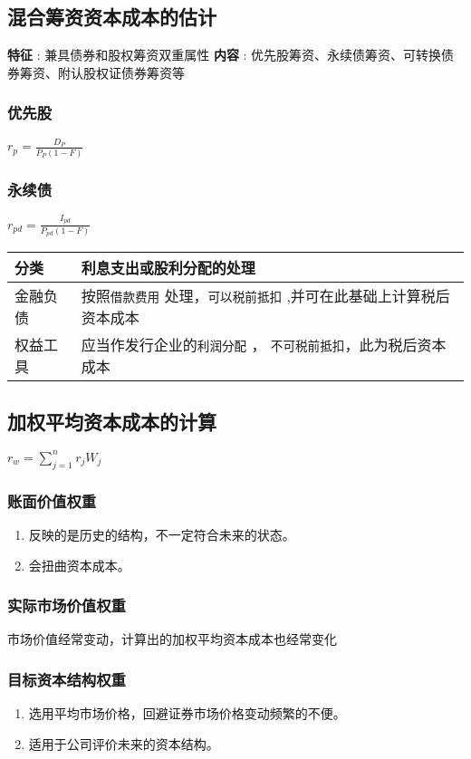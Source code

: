 \documentclass[11pt]{article}
\begin{document}
\subsection{混合筹资资本成本的估计}
\label{sec:org070e446}
\textbf{特征} : 兼具债券和股权筹资双重属性
\textbf{内容} : 优先股筹资、永续债筹资、可转换债券筹资、附认股权证债券筹资等
\subsubsection{优先股}
\label{sec:orgdbcb97a}
\(r_{p}=\frac{D_{P}}{P_{P}(1-F)}\)
\subsubsection{永续债}
\label{sec:orgd77cea3}
\(r_{pd}=\frac{I_{pd}}{P_{pd}(1-F)}\)
\begin{center}
\begin{tabular}{ll}
分类 & 利息支出或股利分配的处理\\
\hline
金融负债 & 按照\texttt{借款费用} 处理，\texttt{可以税前抵扣} ,并可在此基础上计算税后资本成本\\
权益工具 & 应当作发行企业的\texttt{利润分配} ， \texttt{不可税前抵扣}，此为税后资本成本\\
\end{tabular}
\end{center}
\subsection{加权平均资本成本的计算}
\label{sec:orgf6ab5e4}
\(r_{w} = \limits\sum^{n}_{j=1}r_{j}W_{j}\)
\subsubsection{账面价值权重}
\label{sec:orgf7f6c07}
\begin{enumerate}
\item 反映的是历史的结构，不一定符合未来的状态。
\item 会扭曲资本成本。
\end{enumerate}
\subsubsection{实际市场价值权重}
\label{sec:org6f9a7e5}
市场价值经常变动，计算出的加权平均资本成本也经常变化
\subsubsection{目标资本结构权重}
\label{sec:org1c3f115}
\begin{enumerate}
\item 选用平均市场价格，回避证券市场价格变动频繁的不便。
\item 适用于公司评价未来的资本结构。
\end{enumerate}
\end{document}
